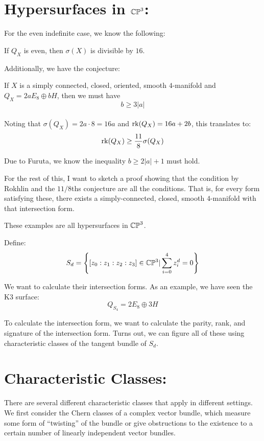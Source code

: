 \documentclass[12pt]{amsart}
\begin{document}
\section{Hypersurfaces in $\mathbb{CP}^3$:}

For the even indefinite case, we know the following:
\begin{theorem}[Rokhlin]
    If $Q_X$ is even, then $\sigma(X)$ is divisible by $16$.
\end{theorem}

Additionally, we have the conjecture: 
\begin{theorem}[11/8-Conjecture]
    If $X$ is a simply connected, closed, oriented, smooth $4$-manifold and $Q_X = 2aE_8 \oplus bH$, then we must have 
    \[ b \geq 3|a| \] \\
    Noting that $\sigma(Q_X) = 2a \cdot 8 = 16a$ and $\operatorname{rk}(Q_X) = 16a + 2b$, this translates to:
    \[ \operatorname{rk}(Q_X) \geq \frac{11}{8} \sigma(Q_X)\]
\end{theorem}

Due to Furuta, we know the inequality $b \geq 2|a|+1$ must hold.

For the rest of this, I want to sketch a proof showing that the condition by Rokhlin and the $11/8$ths conjecture are all the conditions. That is, for every form satisfying these, there exists a simply-connected, closed, smooth $4$-manifold with that intersection form. \bbni

These examples are all hypersurfaces in $\mathbb{CP}^3$. 

Define:
    \[ S_d = \left\{ [z_0 : z_1 : z_2 : z_3] \in \mathbb C\mathbb P^3 | \sum_{i=0}^4 z_i^d = 0\right\}\]

We want to calculate their intersection forms. As an example, we have seen the K3 surface: 
\[ Q_{S_4} = 2E_8 \oplus 3H\]

To calculate the intersection form, we want to calculate the parity, rank, and signature of the intersection form. Turns out, we can figure all of these using characteristic classes of the tangent bundle of $S_d$.


\section{Characteristic Classes:}

There are several different characteristic classes that apply in different settings. We first consider the Chern classes of a complex vector bundle, which measure some form of ``twisting'' of the bundle or give obstructions to the existence to a certain number of linearly independent vector bundles.  
\end{document}

